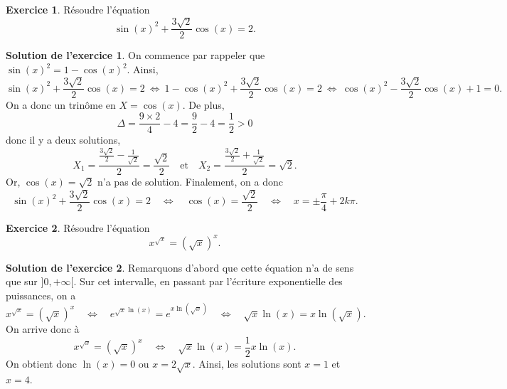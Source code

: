\documentclass[a4paper, 11pt,openany]{article}%
\theoremstyle{plain}
\theoremstyle{definition}
\newtheorem{exo}{Exercice}
\newtheorem{sol}{Solution de l'exercice}
\theoremstyle{remark}
\begin{document}
\begin{exo}
Résoudre l'équation 
\[ \sin(x)^2 + \frac{3\sqrt{2}}{2} \cos(x) =2.\]
\end{exo}
%
\begin{sol}
On commence par rappeler que $\sin(x)^2 = 1 -\cos(x)^2$. Ainsi,
\[ \sin(x)^2 + \frac{3\sqrt{2}}{2} \cos(x) =2 \ \Leftrightarrow \  1 -\cos(x)^2 + \frac{3\sqrt{2}}{2} \cos(x) =2 \ \Leftrightarrow \  \cos(x)^2 - \frac{3\sqrt{2}}{2} \cos(x) +1 = 0. \]
On a donc un trinôme en $X = \cos(x)$. De plus,
\[ \Delta = \frac{9 \times 2}{4} - 4 =  \frac{9}{2} - 4 = \frac{1}{2} > 0\]
donc il y a deux solutions,
\[ X_1 = \frac{\frac{3\sqrt{2}}{2} - \frac{1}{\sqrt{2}}}{2} = \frac{\sqrt{2}}{2} \quad \text{et} \quad X_2 = \frac{\frac{3\sqrt{2}}{2} + \frac{1}{\sqrt{2}}}{2} = \sqrt{2}.\]
Or, $\cos(x) = \sqrt{2}$ n'a pas de solution. Finalement, on a donc
\[ \sin(x)^2 + \frac{3\sqrt{2}}{2} \cos(x) =2 \quad \Leftrightarrow \quad \cos(x) = \frac{\sqrt{2}}{2} \quad \Leftrightarrow \quad x = \pm \frac{\pi}{4} + 2 k \pi.\]
\end{sol}
   



\begin{exo}
Résoudre l'équation 
\[ x^{\sqrt{x}} =(\sqrt{x})^x.\]
\end{exo}

\begin{sol}
Remarquons d'abord que cette équation n'a de sens que sur $]0,+\infty[$. Sur cet intervalle, en passant par l'écriture exponentielle des puissances, on a 
\[x^{\sqrt{x}} =(\sqrt{x})^x \quad \Leftrightarrow \quad e^{\sqrt{x} \ln(x)} = e^{x \ln(\sqrt{x})}
\quad \Leftrightarrow \quad \sqrt{x} \ln(x) = x \ln(\sqrt{x}).\]
On arrive donc à
\[x^{\sqrt{x}} =(\sqrt{x})^x \quad \Leftrightarrow \quad \sqrt{x} \ln(x) = \frac{1}{2} x \ln(x).\]
On obtient donc $\ln(x) =0$ ou $x = 2 \sqrt{x}$. Ainsi, les solutions sont $x =1$ et $x=4$.
\end{sol}
   
\end{document}
